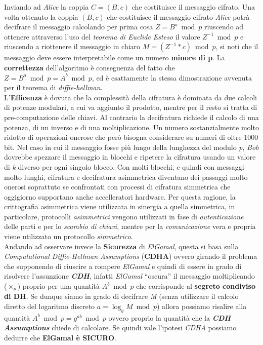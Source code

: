 Inviando ad \textit{Alice} la coppia $C = (B, c)$ che costituisce il messaggio cifrato. Una volta ottenuto la coppia $(B, c)$ che costituisce il messaggio cifrato \textit{Alice} potrà decifrare il messaggio calcolando per prima cosa $Z = B^a \bmod p$ riuscendo ad ottenere attraverso l'uso del \textit{teorema di Euclide Esteso} il valore $Z^{-1} \bmod p$ e riuscendo a riottenere il messaggio in chiaro $M = (Z^{-1} * c) \bmod p$, si noti che il messaggio deve essere interpretabile come un numero \textbf{minore di p}. La \textbf{correttezza} dell'algoritmo è conseguenza del fatto che $Z = B^a \bmod p = A^b \bmod p$, ed è esattamente la stessa dimostrazione avvenuta per il teorema di \textit{diffie-hellman}.
\\ \newline
L'\textbf{Efficenza} è dovuta che la complessità della cifratura è dominata da due calcoli di potenze modulari, a cui va aggiunto il prodotto, mentre per il resto si tratta di pre-computazione delle chiavi. Al contrario la decifratura richiede il calcolo di una potenza, di un inverso e di una moltiplicazione. Un numero sostanzialmente molto ridotto di operazioni onerose che però bisogna considerare su numeri di oltre 1000 bit. Nel caso in cui il messaggio fosse più lungo della lunghezza del modulo \textit{p}, \textit{Bob} dovrebbe spezzare il messaggio in blocchi e ripetere la cifratura usando un valore di \textit{k} diverso per ogni singolo blocco. Con molti blocchi, e quindi con messaggi molto lunghi, cifratura e decifratura asimmetrica diventano dei passaggi molto onerosi soprattuto se confrontati con processi di cifratura simmetrica che oggigiorno supportano anche accelleratori hardware. Per questa ragione, la crittografia asimmetrica viene utilizzata in sinergia a quella simmetrica, in particolare, protocolli \textit{asimmetrici} vengono utilizzati in fase di \textit{autenticazione} delle parti e per lo \textit{scambio di chiavi}, mentre per la \textit{comunicazione} vera e propria viene utilizzato un protocollo \textit{simmetrico}. \\
Andando ad osservare invece la \textbf{Sicurezza} di \textit{ElGamal}, questa si basa sulla \textit{Computational Diffie-Hellman Assumptions} (\textbf{CDHA}) ovvero girando il problema che supponendo di riuscire a rompere \textit{ElGamal} e quindi di essere in grado di risolvere l'assunzione \textbf{\textit{CDH}}, infatti \textit{ElGamal} ``oscura'' il messaggio moltiplicando ($\times_p$) proprio per una quantità $A^b \bmod p$ che corrisponde al \textbf{segreto condiviso di DH}. Se dunque siamo in grado di decifrare \textit{M} (senza utilizzare il calcolo diretto del logaritmo discreto $a = \log_{g}{M} \bmod p$) allora possiamo risalire alla quantità $A^b \bmod p = g^{ab} \bmod p$ ovvero proprio la quantità che la \textbf{\textit{CDH Assumptions}} chiede di calcolare. Se quindi vale l'ipotesi \textit{CDHA} possiamo dedurre che \textbf{ElGamal è SICURO}. \\

